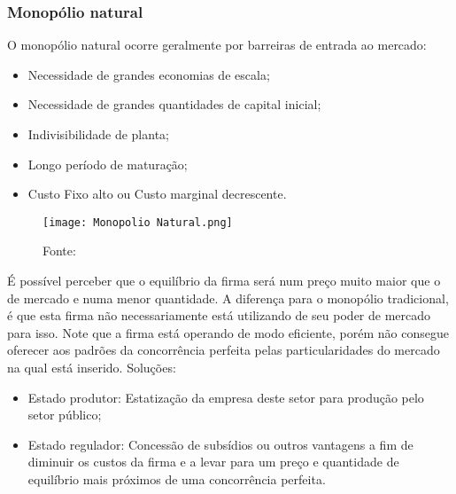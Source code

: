 \documentclass[12pt,a4paper,oneside,brazil]{abntex2}
\begin{document}
\subsubsection{Monopólio natural}
O monopólio natural ocorre geralmente por barreiras de entrada ao mercado:
\begin{itemize}
\item Necessidade de grandes economias de escala;
\item Necessidade de grandes quantidades de capital inicial;
\item Indivisibilidade de planta;
\item Longo período de maturação;
\item Custo Fixo alto ou Custo marginal decrescente.
\end{itemize}

\begin{wrapfigure}{l}{0.5\textwidth}
	\texttt{[image: Monopolio Natural.png]}
	\centering
	\caption{Fonte: \cite{biderman}}
\end{wrapfigure}

É possível perceber que o equilíbrio da firma será num preço muito maior que o de mercado e numa menor quantidade. A diferença para o monopólio tradicional, é que esta firma não necessariamente está utilizando de seu poder de mercado para isso. Note que a firma está operando de modo eficiente, porém não consegue oferecer aos padrões da concorrência perfeita pelas particularidades do mercado na qual está inserido.\newline
Soluções:
\begin{itemize}
\item Estado produtor: Estatização da empresa deste setor para produção pelo setor público;
\item Estado regulador: Concessão de subsídios ou outros vantagens a fim de diminuir os custos da firma e a levar para um preço e quantidade de equilíbrio mais próximos de uma concorrência perfeita.
\end{itemize}
\end{document}
